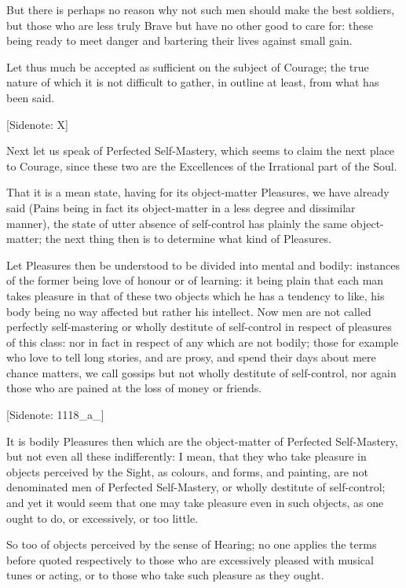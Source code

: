 But there is perhaps no reason why not such men should make the best
soldiers, but those who are less truly Brave but have no other good to
care for: these being ready to meet danger and bartering their lives
against small gain.

Let thus much be accepted as sufficient on the subject of Courage; the
true nature of which it is not difficult to gather, in outline at least,
from what has been said.

[Sidenote: X]

Next let us speak of Perfected Self-Mastery, which seems to claim the
next place to Courage, since these two are the Excellences of the
Irrational part of the Soul.

That it is a mean state, having for its object-matter Pleasures, we have
already said (Pains being in fact its object-matter in a less degree
and dissimilar manner), the state of utter absence of self-control has
plainly the same object-matter; the next thing then is to determine what
kind of Pleasures.

Let Pleasures then be understood to be divided into mental and bodily:
instances of the former being love of honour or of learning: it being
plain that each man takes pleasure in that of these two objects which he
has a tendency to like, his body being no way affected but rather his
intellect. Now men are not called perfectly self-mastering or wholly
destitute of self-control in respect of pleasures of this class: nor in
fact in respect of any which are not bodily; those for example who love
to tell long stories, and are prosy, and spend their days about
mere chance matters, we call gossips but not wholly destitute of
self-control, nor again those who are pained at the loss of money or
friends.

[Sidenote: 1118_a_]

It is bodily Pleasures then which are the object-matter of Perfected
Self-Mastery, but not even all these indifferently: I mean, that they
who take pleasure in objects perceived by the Sight, as colours, and
forms, and painting, are not denominated men of Perfected Self-Mastery,
or wholly destitute of self-control; and yet it would seem that one may
take pleasure even in such objects, as one ought to do, or excessively,
or too little.

So too of objects perceived by the sense of Hearing; no one applies the
terms before quoted respectively to those who are excessively pleased
with musical tunes or acting, or to those who take such pleasure as they
ought.

